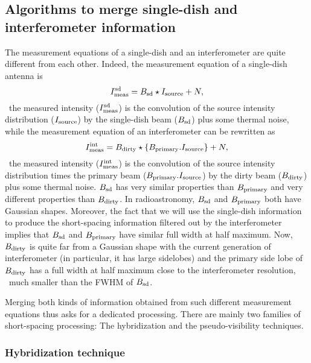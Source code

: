 \subsection{Algorithms to merge single-dish and interferometer information}

The measurement equations of a single-dish and an interferometer are quite
different from each other. Indeed, the measurement equation of a
single-dish antenna is
\begin{equation}
  I_{\mathrm{meas}}^{\mathrm{sd}} = B_{\mathrm{sd}} \star I_{\mathrm{source}} + N,
\end{equation}
\ie\ the measured intensity ($I_{\mathrm{meas}}^{\mathrm{sd}}$) is the convolution of
the source intensity distribution ($I_{\mathrm{source}}$) by the single-dish
beam ($B_{\mathrm{sd}}$) plus some thermal noise, while the measurement equation
of an interferometer can be rewritten as
\begin{equation}
  I_{\mathrm{meas}}^{\mathrm{int}} = B_{\mathrm{dirty}} \star \displaystyle\left\{ B_{\mathrm{primary}}.I_{\mathrm{source}} \right\} + N,
\end{equation}
\ie\ the measured intensity ($I_{\mathrm{meas}}^{\mathrm{int}}$) is the convolution
of the source intensity distribution times the primary beam
($B_{\mathrm{primary}}.I_{\mathrm{source}}$) by the dirty beam ($B_{\mathrm{dirty}}$) plus
some thermal noise. $B_{\mathrm{sd}}$ has very similar properties than
$B_{\mathrm{primary}}$ and very different properties than $B_{\mathrm{dirty}}$.  In
radioastronomy, $B_{\mathrm{sd}}$ and $B_{\mathrm{primary}}$ both have Gaussian
shapes. Moreover, the fact that we will use the single-dish information to
produce the short-spacing information filtered out by the interferometer
implies that $B_{\mathrm{sd}}$ and $B_{\mathrm{primary}}$ have similar full width at
half maximum. Now, $B_{\mathrm{dirty}}$ is quite far from a Gaussian shape with
the current generation of interferometer (in particular, it has large
sidelobes) and the primary side lobe of $B_{\mathrm{dirty}}$ has a full width at
half maximum close to the interferometer resolution, \ie\ much smaller than
the FWHM of $B_{\mathrm{sd}}$.

Merging both kinds of information obtained from such different measurement
equations thus asks for a dedicated processing. There are mainly two
families of short-spacing processing: The hybridization and the
pseudo-visibility techniques.

\subsubsection{Hybridization technique}

